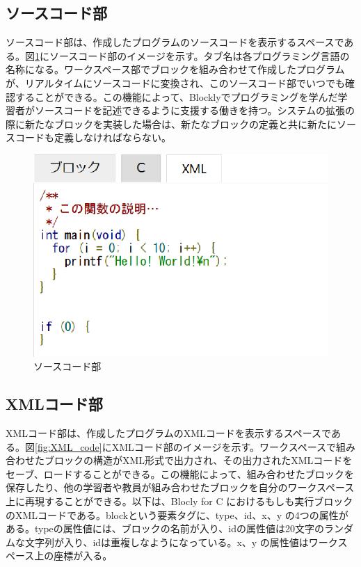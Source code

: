 \documentclass{risepaper}
\begin{document}
   \subsection{ソースコード部}
   
ソースコード部は、作成したプログラムのソースコードを表示するスペースである。図\ref{fig:source_code}にソースコード部のイメージを示す。タブ名は各プログラミング言語の名称になる。ワークスペース部でブロックを組み合わせて作成したプログラムが、リアルタイムにソースコードに変換され、このソースコード部でいつでも確認することができる。この機能によって、Blocklyでプログラミングを学んだ学習者がソースコードを記述できるように支援する働きを持つ。システムの拡張の際に新たなブロックを実装した場合は、新たなブロックの定義と共に新たにソースコードも定義しなければならない。

\begin{figure}[h]
\begin{center}
\includegraphics[scale=0.5]{img/source_code.eps}
\caption{ソースコード部}%
\label{fig:source_code}
\end{center}%
\end{figure}%

   \subsection{XMLコード部}
   
XMLコード部は、作成したプログラムのXMLコードを表示するスペースである。図\ref{fig:XML_code}にXMLコード部のイメージを示す。ワークスペースで組み合わせたブロックの構造がXML形式で出力され、その出力されたXMLコードをセーブ、ロードすることができる。この機能によって、組み合わせたブロックを保存したり、他の学習者や教員が組み合わせたブロックを自分のワークスペース上に再現することができる。以下は、Blocly for C におけるもしも実行ブロックのXMLコードである。blockという要素タグに、type、id、x、y の4つの属性がある。typeの属性値には、ブロックの名前が入り、idの属性値は20文字のランダムな文字列が入り、idは重複しなようになっている。x、y の属性値はワークスペース上の座標が入る。
\end{document}
